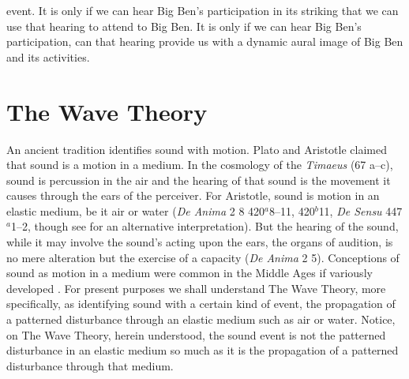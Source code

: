 event. It is only if we can hear Big Ben's participation in its striking that we can use that hearing to attend to Big Ben. It is only if we can hear Big Ben's participation, can that hearing provide us with a dynamic aural image of Big Ben and its activities.

\section{The Wave Theory} %
\label{sec:the_wave_theory}

An ancient tradition identifies sound with motion. Plato and Aristotle claimed that sound is a motion in a medium. In the cosmology of the \emph{Timaeus} (67 a--c), sound is percussion in the air and the hearing of that sound is the movement it causes through the ears of the perceiver. For Aristotle, sound is motion in an elastic medium, be it air or water (\emph{De Anima} 2 8 420\( ^{a} \)8--11, 420\( ^{b} \)11, \emph{De Sensu} 447\( ^{a} \)1--2, though see \citealt[60--1]{OCallaghan:2007xy} for an alternative interpretation). But the hearing of the sound, while it may involve the sound's acting upon the ears, the organs of audition, is no mere alteration but the exercise of a capacity (\emph{De Anima} 2 5). Conceptions of sound as motion in a medium were common in the Middle Ages if variously developed \citep{Pasnau:2000aa}. For present purposes we shall understand The Wave Theory, more specifically, as identifying sound with a certain kind of event, the propagation of a patterned disturbance through an elastic medium such as air or water. Notice, on The Wave Theory, herein understood, the sound event is not the patterned disturbance in an elastic medium so much as it is the propagation of a patterned disturbance through that medium. 

